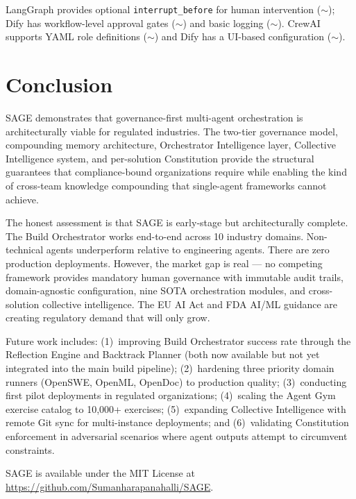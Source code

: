 \documentclass[11pt,a4paper]{article}
\begin{document}
LangGraph provides optional \texttt{interrupt\_before} for human intervention ($\sim$); Dify has workflow-level approval gates ($\sim$) and basic logging ($\sim$). CrewAI supports YAML role definitions ($\sim$) and Dify has a UI-based configuration ($\sim$).

\section{Conclusion}
\label{sec:conclusion}

SAGE demonstrates that governance-first multi-agent orchestration is architecturally viable for regulated industries. The two-tier governance model, compounding memory architecture, Orchestrator Intelligence layer, Collective Intelligence system, and per-solution Constitution provide the structural guarantees that compliance-bound organizations require while enabling the kind of cross-team knowledge compounding that single-agent frameworks cannot achieve.

The honest assessment is that SAGE is early-stage but architecturally complete. The Build Orchestrator works end-to-end across 10 industry domains. Non-technical agents underperform relative to engineering agents. There are zero production deployments. However, the market gap is real --- no competing framework provides mandatory human governance with immutable audit trails, domain-agnostic configuration, nine SOTA orchestration modules, and cross-solution collective intelligence. The EU AI Act and FDA AI/ML guidance are creating regulatory demand that will only grow.

Future work includes: (1)~improving Build Orchestrator success rate through the Reflection Engine and Backtrack Planner (both now available but not yet integrated into the main build pipeline); (2)~hardening three priority domain runners (OpenSWE, OpenML, OpenDoc) to production quality; (3)~conducting first pilot deployments in regulated organizations; (4)~scaling the Agent Gym exercise catalog to 10{,}000+ exercises; (5)~expanding Collective Intelligence with remote Git sync for multi-instance deployments; and (6)~validating Constitution enforcement in adversarial scenarios where agent outputs attempt to circumvent constraints.

SAGE is available under the MIT License at \url{https://github.com/Sumanharapanahalli/SAGE}.

\end{document}

